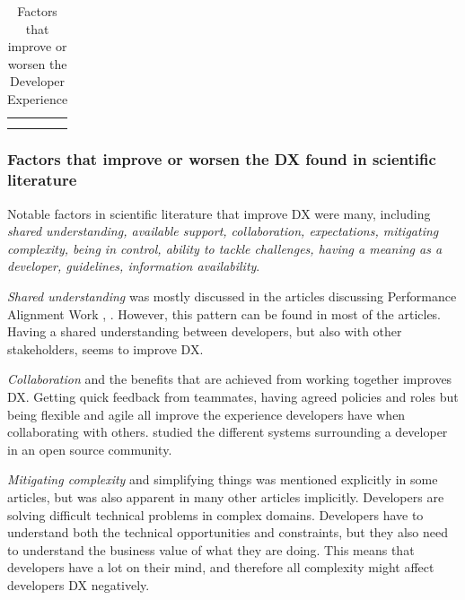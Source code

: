 \documentclass[english, 12pt, a4paper, sci, utf8, a-1b, online]{aaltothesis}
\begin{document}
{\begin{center}
\begin{longtable}{p{0.3\linewidth}p{0.6\linewidth}}
      \captionsetup{width=0.6\textwidth}                                                                                                                                                                                                                                                                                                                                    \\
      \caption{Factors that improve or worsen the Developer Experience}                                                                                                                                                                                                                                                                                                     \\
    \end{longtable}
  \end{center}
  \renewcommand{\arraystretch}{1}
}

\subsubsection{Factors that improve or worsen the DX found in scientific literature}

Notable factors in scientific literature that improve DX were many, including \textit{shared understanding,	available support, collaboration, expectations, mitigating complexity, being in control, ability to tackle challenges, having a meaning as a developer, guidelines, information availability}.

\textit{Shared understanding} was mostly discussed in the articles discussing Performance Alignment Work \parencite{paw}, \parencite{how-developers-experience-team-performance}. However, this pattern can be found in most of the articles. Having a shared understanding between developers, but also with other stakeholders, seems to improve DX.

\textit{Collaboration} and the benefits that are achieved from working together improves DX. Getting quick feedback from teammates, having agreed policies and roles but being flexible and agile all improve the experience developers have when collaborating with others. \textcite{entering-an-ecosystem} studied the different systems surrounding a developer in an open source community.

\textit{Mitigating complexity} and simplifying things was mentioned explicitly in some articles, but was also apparent in many other articles implicitly. Developers are solving difficult technical problems in complex domains. Developers have to understand both the technical opportunities and constraints, but they also need to understand the business value of what they are doing. This means that developers have a lot on their mind, and therefore all complexity might affect developers DX negatively.
\end{document}

